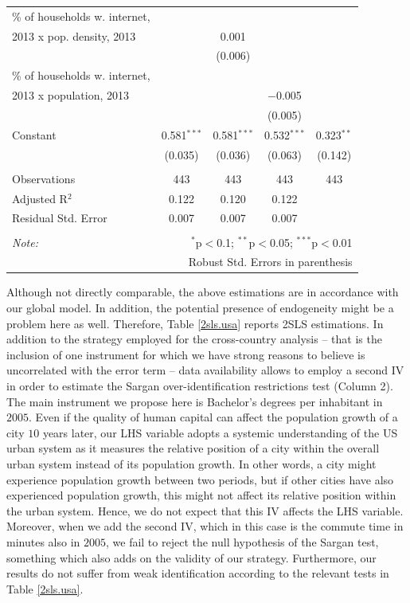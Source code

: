 \documentclass[10pt,letterpaper]{article}
\begin{document}
\begin{table}[!htbp]
\begin{tabular}{@{\extracolsep{1pt}}lcccc}
  \% of households w. internet, \\
                             2013 x pop. density, 2013 &  & 0.001 &  &  \\ 
  &  & (0.006) &  &  \\ 
  \% of households w. internet, \\
                             2013 x population, 2013 &  &  & $-$0.005 &  \\ 
  &  &  & (0.005) &  \\ 
  Constant & 0.581$^{***}$ & 0.581$^{***}$ & 0.532$^{***}$ & 0.323$^{**}$ \\ 
  & (0.035) & (0.036) & (0.063) & (0.142) \\ 
 \hline \\[-1.8ex] 
Observations & 443 & 443 & 443 & 443 \\ 
Adjusted R$^{2}$ & 0.122 & 0.120 & 0.122 &  \\ 
Residual Std. Error & 0.007 & 0.007 & 0.007 &  \\ 
\hline 
\hline \\[-1.8ex] 
\textit{Note:}  & \multicolumn{4}{r}{$^{*}$p$<$0.1; $^{**}$p$<$0.05; $^{***}$p$<$0.01} \\ 
 & \multicolumn{4}{r}{Robust Std. Errors in parenthesis} \\ 
\end{tabular} 
\end{table}

Although not directly comparable, the above estimations are in
accordance with our global model. In addition, the potential presence of
endogeneity might be a problem here as well. Therefore, Table
\ref{2sls.usa} reports 2SLS estimations. In addition to the strategy
employed for the cross-country analysis -- that is the inclusion of one
instrument for which we have strong reasons to believe is uncorrelated
with the error term -- data availability allows to employ a second IV in
order to estimate the Sargan over-identification restrictions test
(Column 2). The main instrument we propose here is Bachelor's degrees
per inhabitant in \(2005\). Even if the quality of human capital can
affect the population growth of a city \(10\) years later, our LHS
variable adopts a systemic understanding of the US urban system as it
measures the relative position of a city within the overall urban system
instead of its population growth. In other words, a city might
experience population growth between two periods, but if other cities
have also experienced population growth, this might not affect its
relative position within the urban system. Hence, we do not expect that
this IV affects the LHS variable. Moreover, when we add the second IV,
which in this case is the commute time in minutes also in \(2005\), we
fail to reject the null hypothesis of the Sargan test, something which
also adds on the validity of our strategy. Furthermore, our results do
not suffer from weak identification according to the relevant tests in
Table \ref{2sls.usa}.
\end{document}
